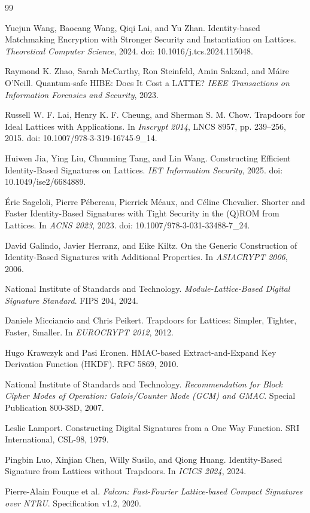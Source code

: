 \documentclass[UTF8,a4paper,12pt,oneside,openany,fontset=fandol]{ctexrep}
\begin{document}
\clearpage
{}
\begin{thebibliography}{99}
\small

Yuejun Wang, Baocang Wang, Qiqi Lai, and Yu Zhan.
Identity-based Matchmaking Encryption with Stronger Security and Instantiation on Lattices.
\emph{Theoretical Computer Science}, 2024.
doi: 10.1016/j.tcs.2024.115048.

Raymond K. Zhao, Sarah McCarthy, Ron Steinfeld, Amin Sakzad, and Máire O'Neill.
Quantum-safe HIBE: Does It Cost a LATTE?
\emph{IEEE Transactions on Information Forensics and Security}, 2023.

Russell W. F. Lai, Henry K. F. Cheung, and Sherman S. M. Chow.
Trapdoors for Ideal Lattices with Applications.
In \emph{Inscrypt 2014}, LNCS 8957, pp. 239--256, 2015.
doi: 10.1007/978-3-319-16745-9\_14.

Huiwen Jia, Ying Liu, Chunming Tang, and Lin Wang.
Constructing Efficient Identity-Based Signatures on Lattices.
\emph{IET Information Security}, 2025.
doi: 10.1049/ise2/6684889.

Éric Sageloli, Pierre Pébereau, Pierrick Méaux, and Céline Chevalier.
Shorter and Faster Identity-Based Signatures with Tight Security in the (Q)ROM from Lattices.
In \emph{ACNS 2023}, 2023.
doi: 10.1007/978-3-031-33488-7\_24.

David Galindo, Javier Herranz, and Eike Kiltz.
On the Generic Construction of Identity-Based Signatures with Additional Properties.
In \emph{ASIACRYPT 2006}, 2006.

National Institute of Standards and Technology.
\emph{Module-Lattice-Based Digital Signature Standard}.
FIPS 204, 2024.

Daniele Micciancio and Chris Peikert.
Trapdoors for Lattices: Simpler, Tighter, Faster, Smaller.
In \emph{EUROCRYPT 2012}, 2012.

Hugo Krawczyk and Pasi Eronen.
HMAC-based Extract-and-Expand Key Derivation Function (HKDF).
RFC 5869, 2010.

National Institute of Standards and Technology.
\emph{Recommendation for Block Cipher Modes of Operation: Galois/Counter Mode (GCM) and GMAC}.
Special Publication 800-38D, 2007.

Leslie Lamport.
Constructing Digital Signatures from a One Way Function.
SRI International, CSL-98, 1979.

Pingbin Luo, Xinjian Chen, Willy Susilo, and Qiong Huang.
Identity-Based Signature from Lattices without Trapdoors.
In \emph{ICICS 2024}, 2024.

Pierre-Alain Fouque et al.
\emph{Falcon: Fast-Fourier Lattice-based Compact Signatures over NTRU}.
Specification v1.2, 2020.

\end{thebibliography}
\end{document}
